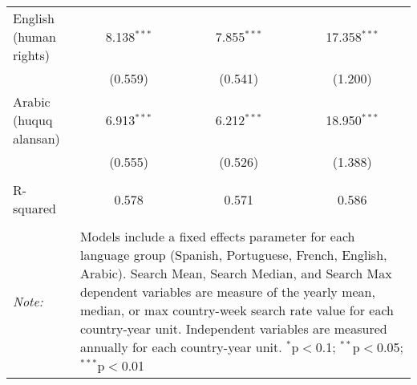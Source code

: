 \begin{table}[!htbp]
\begin{tabular}{@{\extracolsep{5pt}}lccc}
  English (human rights) & 8.138$^{***}$ & 7.855$^{***}$ & 17.358$^{***}$ \\ 
  & (0.559) & (0.541) & (1.200) \\ 
  Arabic (huquq alansan) & 6.913$^{***}$ & 6.212$^{***}$ & 18.950$^{***}$ \\ 
  & (0.555) & (0.526) & (1.388) \\ 
 \hline \\[-1.8ex] 
R-squared  & 0.578 & 0.571 & 0.586 \\ 
\hline 
\hline \\[-1.8ex] 
\textit{Note:}  & \multicolumn{3}{l}{\parbox[t]{8cm}{Models include a fixed effects parameter for each language group (Spanish, Portuguese, French, English, Arabic). Search Mean, Search Median, and Search Max dependent variables are measure of the yearly mean, median, or max country-week search rate value for each country-year unit. Independent variables are measured annually for each country-year unit. $^{*}$p$<$0.1; $^{**}$p$<$0.05; $^{***}$p$<$0.01}} \\ 
\end{tabular} 
\end{table} 
